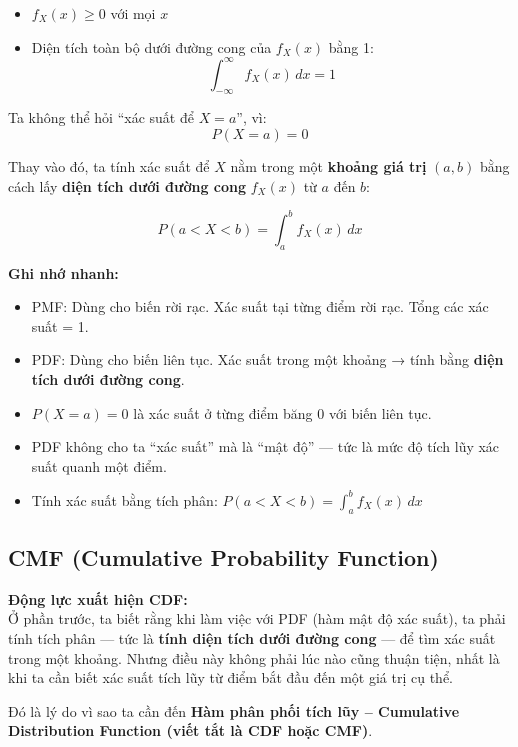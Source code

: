 \documentclass[11pt]{article}
\begin{document}
\begin{itemize}
    \item $f_X(x) \geq 0$ với mọi $x$
    \item Diện tích toàn bộ dưới đường cong của $f_X(x)$ bằng 1:
    \[
    \int_{-\infty}^{\infty} f_X(x) \, dx = 1
    \]
\end{itemize}

Ta không thể hỏi “xác suất để $X = a$”, vì:
\[
P(X = a) = 0
\]

Thay vào đó, ta tính xác suất để $X$ nằm trong một \textbf{khoảng giá trị} $(a, b)$ bằng cách lấy \textbf{diện tích dưới đường cong} $f_X(x)$ từ $a$ đến $b$:

\[
P(a < X < b) = \int_a^b f_X(x) \, dx
\]

\vspace{1em}	

\begin{summarybox}
    \textbf{Ghi nhớ nhanh:} 
    \begin{itemize}
        \item PMF: Dùng cho biến rời rạc. Xác suất tại từng điểm rời rạc. Tổng các xác suất = 1.
        \item PDF: Dùng cho biến liên tục. Xác suất trong một khoảng → tính bằng \textbf{diện tích dưới đường cong}.
        \item $P(X = a) = 0$ là xác suất ở từng điểm băng 0 với biến liên tục.
        \item PDF không cho ta “xác suất” mà là “mật độ” — tức là mức độ tích lũy xác suất quanh một điểm.
        \item Tính xác suất bằng tích phân: $\displaystyle P(a < X < b) = \int_a^b f_X(x)\, dx$
    \end{itemize}
\end{summarybox}

\subsection{CMF (Cumulative Probability Function)}

\textbf{Động lực xuất hiện CDF:} \\

Ở phần trước, ta biết rằng khi làm việc với PDF (hàm mật độ xác suất), ta phải tính tích phân — tức là \textbf{tính diện tích dưới đường cong} — để tìm xác suất trong một khoảng. Nhưng điều này không phải lúc nào cũng thuận tiện, nhất là khi ta cần biết xác suất tích lũy từ điểm bắt đầu đến một giá trị cụ thể.

Đó là lý do vì sao ta cần đến \textbf{Hàm phân phối tích lũy – Cumulative Distribution Function (viết tắt là CDF hoặc CMF)}.
\end{document}
